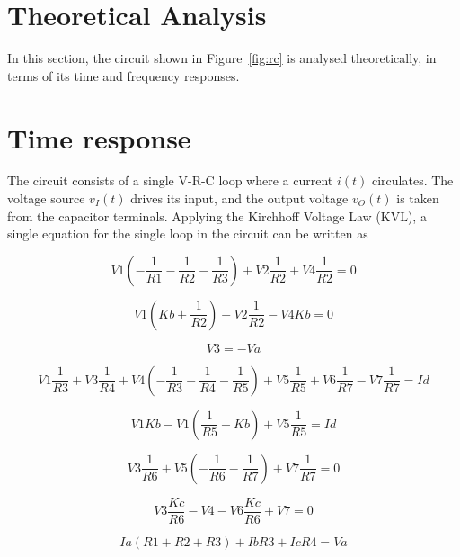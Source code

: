 \section{Theoretical Analysis}
\label{sec:analysis}

In this section, the circuit shown in Figure~\ref{fig:rc} is analysed
theoretically, in terms of its time and frequency responses.

\section{Time response}

The circuit consists of a single V-R-C loop where a current $i(t)$ circulates. The
voltage source $v_I(t)$ drives its input, and the output voltage $v_O(t)$ is taken from
the capacitor terminals. Applying the Kirchhoff Voltage Law (KVL), a single
equation for the single loop in the circuit can be written as

\begin{equation}
  V1(-\frac{1}{R1}-\frac{1}{R2}-\frac{1}{R3}) + V2\frac{1}{R2} + V4\frac{1}{R2} = 0
\end{equation}

\begin{equation}
  V1(Kb+\frac{1}{R2}) -V2\frac{1}{R2} - V4Kb = 0
\end{equation}

\begin{equation}
  V3=-Va
\end{equation}

\begin{equation}
  V1\frac{1}{R3} + V3\frac{1}{R4} + V4(-\frac{1}{R3}-\frac{1}{R4}-\frac{1}{R5}) + V5\frac{1}{R5} + V6\frac{1}{R7} - V7\frac{1}{R7} = Id
\end{equation}

\begin{equation}
  V1Kb - V1(\frac{1}{R5}-Kb) + V5\frac{1}{R5}= Id
\end{equation}

\begin{equation}
  V3\frac{1}{R6} + V5(-\frac{1}{R6}-\frac{1}{R7}) + V7\frac{1}{R7}= 0
\end{equation}

\begin{equation}
  V3\frac{Kc}{R6} - V4 - V6\frac{Kc}{R6} + V7 = 0
\end{equation}

\begin{equation}
  Ia(R1+R2+R3) + IbR3 + IcR4 = Va
\end{equation}

